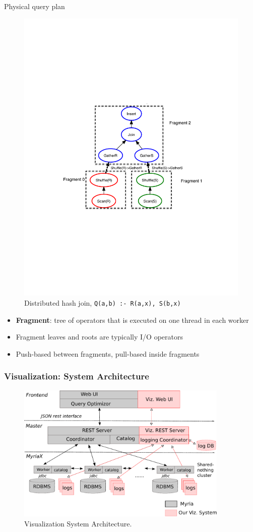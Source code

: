 \documentclass[mathserif,serif]{beamer}
\begin{document}
\begin{frame}{Physical query plan}
  \begin{figure}
   \begin{center}
       \includegraphics[width=.6\textwidth]{join}
     \end{center}
    \caption{Distributed hash join, \texttt{Q(a,b) :- R(a,x), S(b,x)}}
  \end{figure}
  \begin{itemize}
   \item \textbf{Fragment}: tree of operators that is executed on one thread in each worker
  	\item Fragment leaves and roots are typically I/O operators
    \item Push\--based between fragments, pull\--based inside fragments
  \end{itemize}
\end{frame}

\begin{frame}
  \frametitle{Visualization: System Architecture}
  \begin{figure}
  	 \begin{center}
       \includegraphics[width=0.9\textwidth]{viz_arch.pdf}
     \end{center}
     \caption{Visualization System Architecture.}
    \label{fig:viz_arc}
  \end{figure}
\end{frame}
\end{document}
